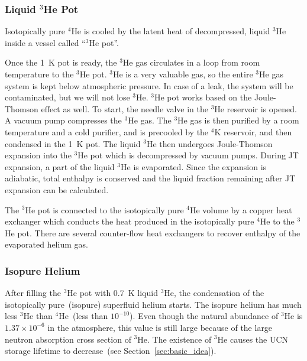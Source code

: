    

\subsubsection{Liquid $^3$He Pot}

Isotopically pure $^4$He is cooled by the latent heat of decompressed,
liquid $^3$He inside a vessel called ``$^3$He pot''.


Once the 1~K pot is ready, the $^3$He gas circulates in a loop from
room temperature to the $^3$He pot. $^3$He is a very valuable gas, so
the entire $^3$He gas system is kept below atmospheric pressure. In
case of a leak, the system will be contaminated, but we will not lose
$^3$He. $^3$He pot works based on the Joule-Thomson effect as well.
To start, the needle valve in the $^3$He reservoir is opened. A vacuum
pump compresses the $^3$He gas. The $^3$He gas is then purified by a
room temperature and a cold purifier, and is precooled by the $^4$K
reservoir, and then condensed in the 1~K pot. The liquid $^3$He then
undergoes Joule-Thomson expansion into the $^3$He pot which is
decompressed by vacuum pumps. During JT expansion, a part of the
liquid $^3$He is evaporated. Since the expansion is adiabatic, total
enthalpy is conserved and the liquid fraction remaining after JT
expansion can be calculated.

The $^3$He pot is connected to the isotopically pure $^4$He volume by
a copper heat exchanger which conducts the heat produced in the
isotopically pure $^4$He to the $^3$He pot. There are several
counter-flow heat exchangers to recover enthalpy of the evaporated
helium gas.



\subsubsection{Isopure Helium}
After filling the $^3$He pot with 0.7~K liquid $^3$He, the
condensation of the isotopically pure~(isopure) superfluid helium
starts. The isopure helium has much less $^3$He than $^4$He~(less than
$10^{-10}$).  Even though the natural abundance of $^3$He is
$1.37 \times 10^{-6}$ in the atmosphere, this value is still large
because of the large neutron absorption cross section of $^3$He. The
existence of $^3$He causes the UCN storage lifetime to decrease~(see
Section~\ref{sec:basic_idea}).

